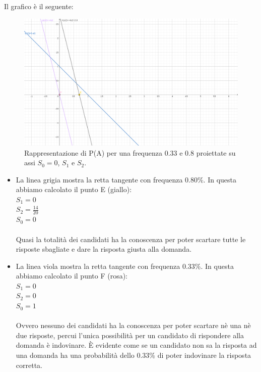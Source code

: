 Il grafico \`e il seguente:

\begin{figure}[H]
\centering
	\includegraphics[width=0.90\linewidth]{./image/esempio2.png}
	\caption{Rappresentazione di P(A) per una frequenza 0.33 e 0.8 proiettate su assi $S_0=0$, $S_1$ e $S_2$.}
	\label{Rappresentazione di P(A) per una frequenza 0.33 e 0.8 proiettate su assi S_0=0, S_1 e S_2.}
\end{figure}

\begin{itemize}
\item La linea grigia mostra la retta tangente con frequenza 0.80\%.
In questa abbiamo calcolato il punto E (giallo):\\
$S_1=0$\\
$S_2=\frac{14}{20}$\\
$S_0=0$\\
\\
Quasi la totalit\`a dei candidati ha la conoscenza per poter scartare tutte le risposte sbagliate e dare la risposta giusta alla domanda.
\item La linea viola mostra la retta tangente con frequenza 0.33\%.
In questa abbiamo calcolato il punto F (rosa):\\
$S_1=0$\\
$S_2=0$\\
$S_0=1$\\
\\ 
Ovvero nessuno dei candidati ha la conoscenza per poter scartare n\`e una n\`e due risposte, percui l'unica possibilit\`a per un candidato di rispondere alla domanda \`e indovinare. \`E evidente come se un candidato non sa la risposta ad una domanda ha una probabilit\`a dello 0.33\% di poter indovinare la risposta corretta.
\end{itemize}


